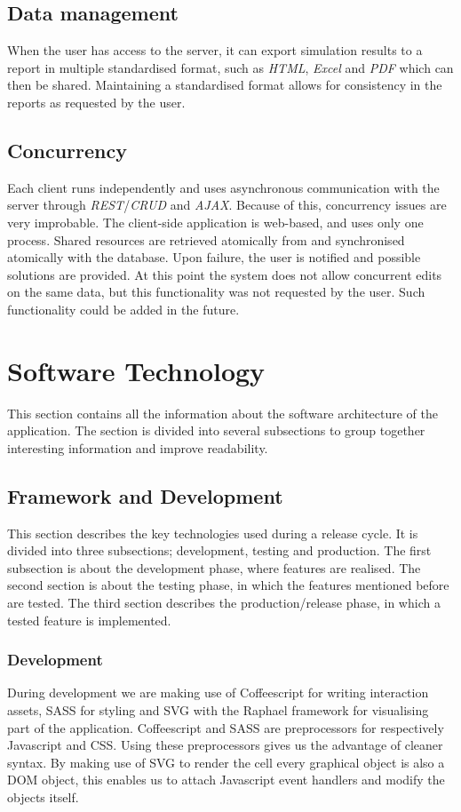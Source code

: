 \documentclass{report}
\begin{document}
		\subsection{Data management}
			When the user has access to the server, it can export simulation results to a report in multiple standardised format, such as \emph{HTML}, \emph{Excel} and \emph{PDF} which can then be shared. Maintaining a standardised format allows for consistency in the reports as requested by the user.		
	
		\subsection{Concurrency}
			Each client runs independently and uses asynchronous communication with the server through \emph{REST}/\emph{CRUD} and \emph{AJAX}. Because of this, concurrency issues are very improbable. The client-side application is web-based, and uses only one process. Shared resources are retrieved atomically from and synchronised atomically with the database. Upon failure, the user is notified and possible solutions are provided. At this point the system does not allow concurrent edits on the same data, but this functionality was not requested by the user. Such functionality could be added in the future.\\		
			
	\clearpage
	\section{Software Technology}
		This section contains all the information about the software architecture of the application. The section is divided into several subsections to group together interesting information and improve readability.	
		
		\subsection{Framework and Development}
			This section describes the key technologies used during a release cycle.
			It is divided into three subsections; development, testing and production.
			The first subsection is about the development phase, where features are realised.
			The second section is about the testing phase, in which the features mentioned before are tested.
			The third section describes the production/release phase, in which a tested feature is implemented.
			
			\subsubsection{Development}
				During development we are making use of Coffeescript \cite{coffeescript} for writing interaction assets, SASS \cite{sass} for styling and SVG \cite{svg} with the Raphael \cite{raphael} framework for visualising part of the application.
				Coffeescript and SASS are preprocessors for respectively Javascript and CSS. Using these preprocessors gives us the advantage of cleaner syntax.
				By making use of SVG to render the cell every graphical object is also a DOM object, this enables us to attach Javascript event handlers and modify the objects itself.
				
\end{document}
